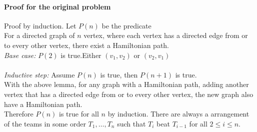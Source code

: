 \documentclass[letter]{article}
\begin{document}
\paragraph{Proof for the original problem}
Proof by induction.
Let $P(n)$ be the predicate\\
For a directed graph of $n$ vertex, where each vertex has a directed edge from or to every other vertex, there exist a Hamiltonian path.
 \\
\emph{Base case:} $P(2)$ is true.Either $(v_1,v_2)$ or $(v_2,v_1)$\\
 \\
\emph{Inductive step:} Assume $P(n)$ is true, then $P(n+1)$ is true.\\
With the above lemma, for any graph with a Hamiltonian path, adding another vertex that has a directed edge from or to every other vertex, the new graph also have a Hamiltonian path.\\
Therefore $P(n)$ is true for all $n$ by induction.
There are always a arrangement of the teams in some order $T_1, \ldots, T_n$ such
that $T_i$ beat $T_{i-1}$ for all $2\leq i\leq n$.
\end{document}
